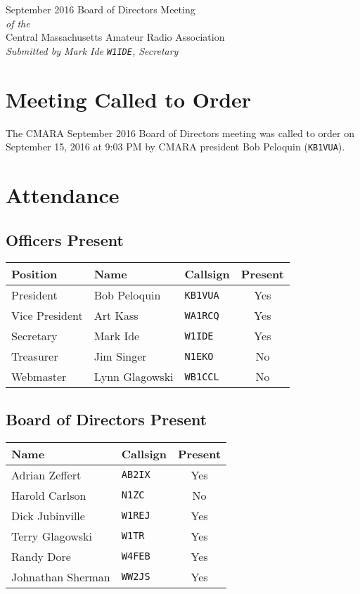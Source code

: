 \documentclass[10pt,letterpaper]{article}
\begin{document}
\begin{center}
{\huge September 2016 Board of Directors Meeting}\\
\emph{of the}\\
{\Large Central Massachusetts Amateur Radio Association}\\
\emph{Submitted by Mark Ide \texttt{W1IDE}, Secretary}
\end{center}

\section{Meeting Called to Order}
The CMARA September 2016 Board of Directors meeting was called to order on September 15, 2016 at 9:03 PM by CMARA president Bob Peloquin (\texttt{KB1VUA}).

\section{Attendance}

\subsection{Officers Present}

\begin{tabular}{|l|l|l|c|}
  \hline
  \textbf{Position} & \textbf{Name}  & \textbf{Callsign} & \textbf{Present} \\ \hline
  President         & Bob Peloquin   & \texttt{KB1VUA}   & Yes \\
  Vice President    & Art Kass       & \texttt{WA1RCQ}   & Yes \\
  Secretary         & Mark Ide       & \texttt{W1IDE}    & Yes \\
  Treasurer         & Jim Singer     & \texttt{N1EKO}    & No  \\
  Webmaster         & Lynn Glagowski & \texttt{WB1CCL}   & No  \\
  \hline
\end{tabular}

\subsection{Board of Directors Present}

\begin{tabular}{|l|l|c|}
  \hline
  \textbf{Name}     & \textbf{Callsign} & \textbf{Present} \\ \hline
  Adrian Zeffert    & \texttt{AB2IX}    & Yes \\
  Harold Carlson    & \texttt{N1ZC}     & No  \\
  Dick Jubinville   & \texttt{W1REJ}    & Yes \\
  Terry Glagowski   & \texttt{W1TR}     & Yes \\
  Randy Dore        & \texttt{W4FEB}    & Yes \\
  Johnathan Sherman & \texttt{WW2JS}    & Yes \\
  \hline
\end{tabular}
\end{document}

